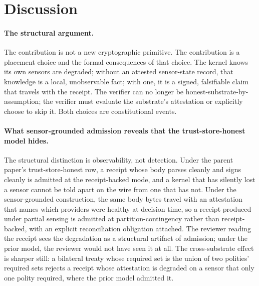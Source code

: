 \section{Discussion}
\label{sec:discussion}

\paragraph{The structural argument.}
The contribution is not a new cryptographic primitive. The contribution is a placement choice and the formal consequences of that choice. The kernel knows its own sensors are degraded; without an attested sensor-state record, that knowledge is a local, unobservable fact; with one, it is a signed, falsifiable claim that travels with the receipt. The verifier can no longer be honest-substrate-by-assumption; the verifier must evaluate the substrate's attestation or explicitly choose to skip it. Both choices are constitutional events.

\paragraph{What sensor-grounded admission reveals that the trust-store-honest model hides.}
The structural distinction is observability, not detection. Under the parent paper's trust-store-honest row, a receipt whose body parses cleanly and signs cleanly is admitted at the receipt-backed mode, and a kernel that has silently lost a sensor cannot be told apart on the wire from one that has not. Under the sensor-grounded construction, the same body bytes travel with an attestation that names which providers were healthy at decision time, so a receipt produced under partial sensing is admitted at partition-contingency rather than receipt-backed, with an explicit reconciliation obligation attached. The reviewer reading the receipt sees the degradation as a structural artifact of admission; under the prior model, the reviewer would not have seen it at all. The cross-substrate effect is sharper still: a bilateral treaty whose required set is the union of two polities' required sets rejects a receipt whose attestation is degraded on a sensor that only one polity required, where the prior model admitted it.

